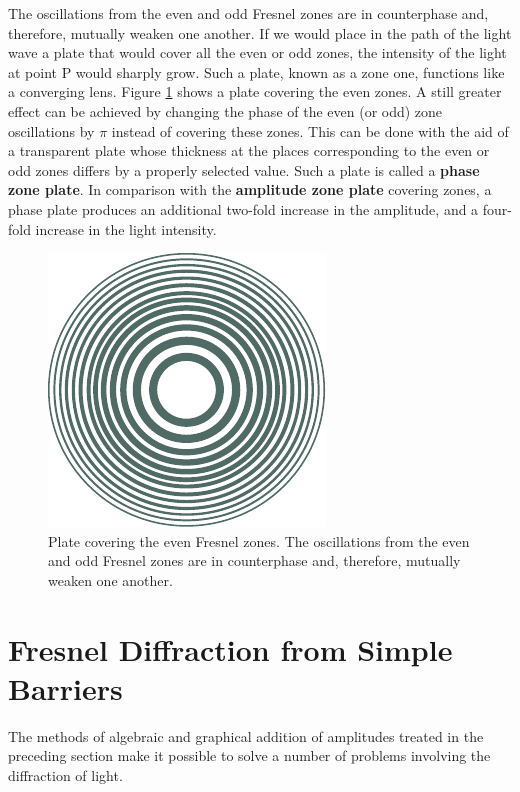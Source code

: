 The oscillations from the even and odd Fresnel zones are in counterphase and, therefore, mutually weaken one another.
If we would place in the path of the light wave a plate that would cover all the even or odd zones, the intensity of the light at point P would sharply grow.
Such a plate, known as a zone one, functions like a converging lens.
Figure \ref{fig:18_9} shows a plate covering the
even zones.
A still greater effect can be achieved by changing the phase of the even (or odd) zone oscillations by $\pi$ instead of covering these
zones.
This can be done with the aid of a transparent plate whose thickness at the places corresponding
to the even or odd zones differs by a properly selected value.
Such a plate is called a \textbf{phase zone plate}.
In comparison with the \textbf{amplitude zone plate} covering zones, a phase plate produces an additional two-fold increase in the amplitude, and a four-fold increase in the light intensity.

\begin{figure}[!htb]
	\begin{center}
		\includegraphics[scale=1]{figures/ch_18/fig_18_9.pdf}
        \caption[]{Plate covering the even Fresnel zones. The oscillations from the even and odd Fresnel zones are in counterphase and, therefore, mutually weaken one another.}
		\label{fig:18_9}
	\end{center}
	\vspace{-0.8cm}
\end{figure}

\section{Fresnel Diffraction from Simple Barriers}\label{sec:18_4}

The methods of algebraic and graphical addition of amplitudes treated in the preceding section make it possible to solve a number of problems involving the diffraction of light.

